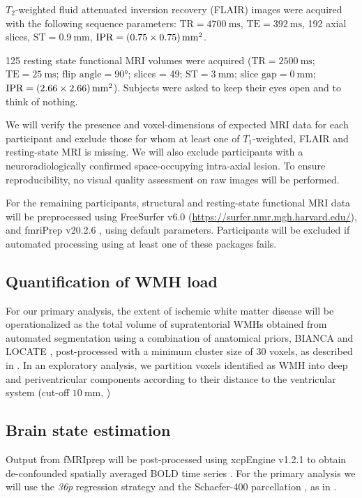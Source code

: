 $T_2$-weighted fluid attenuated inversion recovery (FLAIR) images were acquired with the following sequence parameters: $\text{TR} = \qty{4700}{\ms}$, $\text{TE} = \qty{392}{\ms}$, \num{192} axial slices, $\text{ST} = \qty{0.9}{\mm}$, $\text{IPR} = \qtyproduct[product-units = bracket-power]{0.75 x 0.75}{\mm}$.

\num{125} resting state functional MRI volumes were acquired ($\text{TR} = \qty{2500}{\ms}$; $\text{TE} = \qty{25}{\ms}$; $\text{flip angle} = \ang[]{90}$; slices = \num{49}; $\text{ST} = \qty{3}{\mm}$; $\text{slice gap} = \qty{0}{\mm}$; $\text{IPR} = \qtyproduct[product-units = bracket-power]{2.66 x 2.66}{\mm}$).
Subjects were asked to keep their eyes open and to think of nothing.

We will verify the presence and voxel-dimensions of expected MRI data for each participant and exclude those for whom at least one of $T_1$-weighted, FLAIR and resting-state MRI is missing. We will also exclude participants with a neuroradiologically confirmed space-occupying intra-axial lesion.
To ensure reproducibility, no visual quality assessment on raw images will be performed.

For the remaining participants, structural and resting-state functional MRI data will be preprocessed using FreeSurfer v6.0 (\url{https://surfer.nmr.mgh.harvard.edu/}), and fmriPrep v20.2.6 \citep{Esteban2019-sx}, using default parameters. Participants will be excluded if automated processing using at least one of these packages fails.

\subsection{Quantification of WMH load}
For our primary analysis, the extent of ischemic white matter disease will be operationalized as the total volume of supratentorial WMHs obtained from automated segmentation using a combination of anatomical priors, BIANCA \citep{Griffanti2016-dt} and LOCATE \citep{Sundaresan2019-ww}, post-processed with a minimum cluster size of \num{30} voxels, as described in \citep{Schlemm2022-he}.
In an exploratory analysis, we partition voxels identified as WMH into deep and periventricular components according to their distance to the ventricular system (cut-off $\qty{10}{\mm}$, \citep{Griffanti2018-oa})

\subsection{Brain state estimation}
Output from fMRIprep will be post-processed using xcpEngine v1.2.1 to obtain de-confounded spatially averaged BOLD time series \citep{Ciric2017-cl}.
For the primary analysis we will use the \textit{36p} regression strategy and the Schaefer-\num{400} parcellation \citep{Schaefer2018-bo}, as in \citep{Schlemm2022-he}.
 
